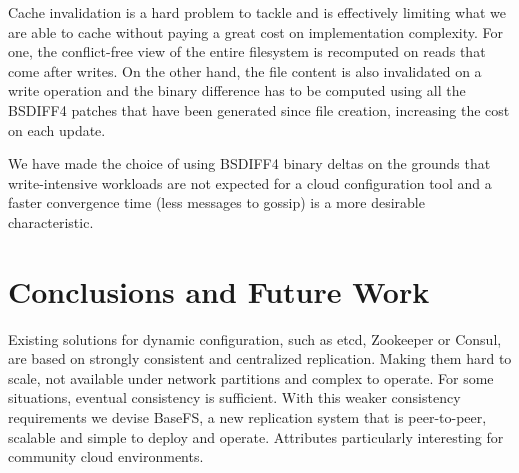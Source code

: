 \documentclass{sig-alternate}
\begin{document}
Cache invalidation is a hard problem to tackle and is effectively limiting what we are able to cache without paying a great cost on implementation complexity. For one, the conflict-free view of the entire filesystem is recomputed on reads that come after 
writes. On the other hand, the file content is also invalidated on a write operation and the binary difference has to be computed using all the BSDIFF4 patches that have been generated since file creation, increasing the cost on each update.

We have made the choice of using BSDIFF4 binary deltas on the grounds that write-intensive workloads are not expected for a cloud configuration tool and a faster convergence time (less messages to gossip) is a more desirable characteristic.


\section{Conclusions and Future Work}

Existing solutions for dynamic configuration, such as etcd, Zookeeper or Consul, are based on strongly consistent and centralized replication. Making them hard to scale, not available under network partitions and complex to operate. For some situations, eventual consistency is sufficient. With this weaker consistency requirements we devise BaseFS, a new replication system that is peer-to-peer, scalable and simple to deploy and operate. Attributes particularly interesting for community cloud environments.
\end{document}
